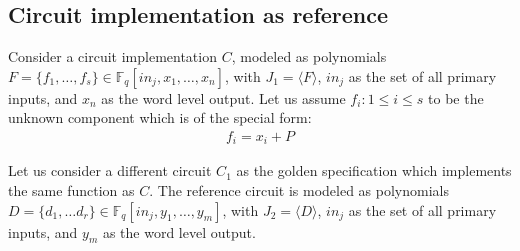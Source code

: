 

\subsection{Circuit implementation as reference}
Consider a circuit implementation $C$, modeled as polynomials $F = \{f_1,\dots,f_s\}\in \mathbb{F}_q[in_j,x_1,\dots, x_n]$, with $J_1=\langle F \rangle$, $in_j$ as the set of all primary inputs, and $x_n$ as the word level output. Let us assume $f_i:1\le i \le s$ to be the unknown component which is of the special form:
\begin{gather*} 
f_i = x_i + P
\end{gather*}

Let us consider a different circuit $C_1$ as the golden specification which implements the same function as $C$. The reference circuit is modeled as polynomials $D = \{d_1,\dots d_r\}\in \mathbb{F}_q[in_j,y_1,\dots, y_m]$, with $J_2=\langle D \rangle$, $in_j$ as the set of all primary inputs, and $y_m$ as the word level output.

